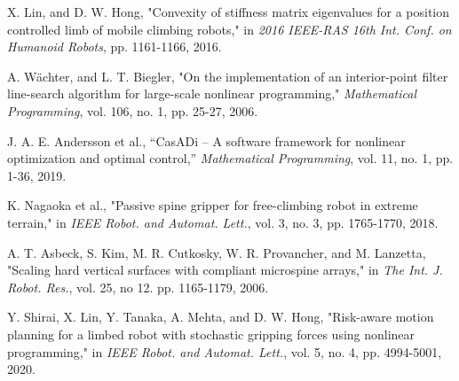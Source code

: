 \documentclass[letterpaper, 10 pt, conference]{ieeeconf}  %
\begin{document}
\begin{thebibliography}{99}
 X. Lin, and D. W. Hong, "Convexity of stiffness matrix eigenvalues for a position controlled limb of mobile climbing robots," in \emph{2016 IEEE-RAS 16th Int. Conf. on Humanoid Robots}, pp. 1161-1166, 2016.

 A. W{\"a}chter, and L. T. Biegler, "On the implementation of an interior-point filter line-search algorithm for large-scale nonlinear programming," \emph{Mathematical Programming}, vol. 106, no. 1, pp. 25-27, 2006.

 J. A. E. Andersson et al., “CasADi – A software framework for nonlinear
optimization and optimal control,” \emph{Mathematical Programming}, vol. 11,
no. 1, pp. 1-36, 2019.


 K. Nagaoka et al., "Passive spine gripper for free-climbing robot in extreme terrain," in \emph{IEEE Robot. and Automat. Lett.}, vol. 3, no. 3, pp. 1765-1770, 2018.

 A. T. Asbeck, S. Kim, M. R. Cutkosky, W. R. Provancher, and M. Lanzetta, "Scaling hard vertical surfaces with compliant microspine arrays," in \emph{The Int. J. Robot. Res.}, vol. 25, no 12. pp. 1165-1179, 2006.

 Y. Shirai, X. Lin, Y. Tanaka, A. Mehta, and D. W. Hong, "Risk-aware motion planning for a limbed robot with stochastic gripping forces using nonlinear programming," in \emph{IEEE Robot. and Automat. Lett.}, vol. 5, no. 4, pp. 4994-5001, 2020. 



\end{thebibliography}
\end{document}
